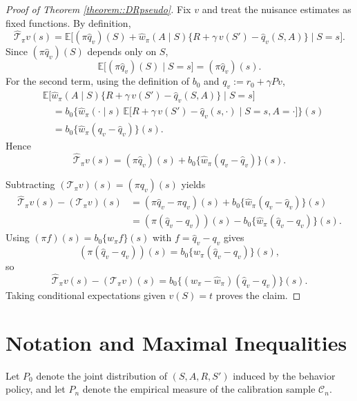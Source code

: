 \documentclass{article}
\theoremstyle{plain}
\theoremstyle{definition}
\theoremstyle{remark}
\begin{document}
\begin{proof}[Proof of Theorem \ref{theorem::DRpseudo}]
Fix $v$ and treat the nuisance estimates as fixed functions. By definition,
\[
\widehat{\mathcal T}_\pi v(s)
=
\mathbb{E}\Big[
(\pi \hat q_v)(S)
+
\widehat w_{\pi}(A \mid S)
\big\{
  R + \gamma\, v(S') - \hat{q}_v(S,A)
\big\}
\;\Big|\; S = s
\Big].
\]
Since $(\pi \hat q_v)(S)$ depends only on $S$,
\[
\mathbb{E}\big[(\pi \hat q_v)(S)\mid S=s\big] = (\pi \hat q_v)(s).
\]
For the second term, using the definition of $b_0$ and $q_v := r_0 + \gamma P v$,
\begin{align*}
&\mathbb{E}\Big[
\widehat w_{\pi}(A \mid S)
\big\{
  R + \gamma\, v(S') - \hat{q}_v(S,A)
\big\}
\;\Big|\; S = s
\Big] \\
&\quad=
b_0\Big\{
\widehat w_\pi(\cdot \mid s)\,
\mathbb{E}\big[
R + \gamma\, v(S') - \hat q_v(s,\cdot)
\mid S = s, A = \cdot
\big]
\Big\}(s) \\
&\quad=
b_0\big\{\widehat w_\pi (q_v - \hat q_v)\big\}(s).
\end{align*}
Hence
\[
\widehat{\mathcal T}_\pi v(s)
=
(\pi \hat q_v)(s)
+
b_0\big\{\widehat w_\pi (q_v - \hat q_v)\big\}(s).
\]

Subtracting $(\mathcal T_\pi v)(s) = (\pi q_v)(s)$ yields
\begin{align*}
\widehat{\mathcal T}_\pi v(s) - (\mathcal T_\pi v)(s)
&=
(\pi \hat q_v - \pi q_v)(s)
+
b_0\big\{\widehat w_\pi (q_v - \hat q_v)\big\}(s) \\
&=
(\pi (\hat q_v - q_v))(s)
-
b_0\big\{\widehat w_\pi (\hat q_v - q_v)\big\}(s).
\end{align*}
Using $(\pi f)(s) = b_0\{w_\pi f\}(s)$ with $f = \hat q_v - q_v$ gives
\[
(\pi (\hat q_v - q_v))(s)
=
b_0\{w_\pi (\hat q_v - q_v)\}(s),
\]
so
\[
\widehat{\mathcal T}_\pi v(s) - (\mathcal T_\pi v)(s)
=
b_0\big\{(w_\pi - \widehat w_\pi)(\hat q_v - q_v)\big\}(s).
\]
Taking conditional expectations given \(v(S)=t\) proves the claim.
\end{proof}



\section{Notation and Maximal Inequalities}

Let $P_0$ denote the joint distribution of $(S, A, R, S')$ induced by the
behavior policy, and let $P_n$ denote the empirical measure of the calibration
sample $\mathcal{C}_n$.
\end{document}
